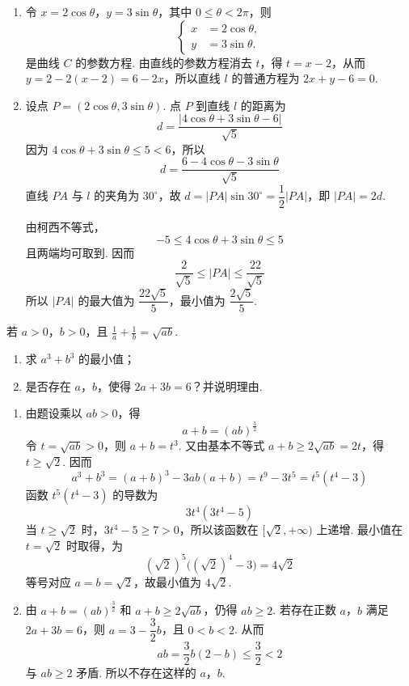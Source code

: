 \begin{solution}
\begin{enumerate}
\item 令 \(x=2\cos\theta\)，\(y=3\sin\theta\)，其中
\(0\leqslant\theta<2\pi\)，则
\[
\left\{
\begin{aligned}
x&=2\cos\theta,\\
y&=3\sin\theta.
\end{aligned}
\right.
\]
是曲线 \(C\) 的参数方程. 由直线的参数方程消去 \(t\)，得
\(t=x-2\)，从而 \(y=2-2(x-2)=6-2x\)，所以直线 \(l\) 的普通方程为
\(2x+y-6=0\).

\item 设点 \(P=(2\cos\theta,3\sin\theta)\). 点 \(P\) 到直线 \(l\) 的距离为
\[
d=\frac{|4\cos\theta+3\sin\theta-6|}{\sqrt5}
\]
因为 \(4\cos\theta+3\sin\theta\leqslant5<6\)，所以
\[
d=\frac{6-4\cos\theta-3\sin\theta}{\sqrt5}
\]
直线 \(PA\) 与 \(l\) 的夹角为 \(30^{\circ}\)，故
\(d=|PA|\sin30^{\circ}=\dfrac12|PA|\)，即 \(|PA|=2d\).

由柯西不等式，
\[
-5\leqslant4\cos\theta+3\sin\theta\leqslant5
\]
且两端均可取到. 因而
\[
\frac{2}{\sqrt5}\leqslant|PA|\leqslant\frac{22}{\sqrt5}
\]
所以 \(|PA|\) 的最大值为 \(\dfrac{22\sqrt5}{5}\)，最小值为
\(\dfrac{2\sqrt5}{5}\).
\end{enumerate}
\end{solution}

\begin{problem}
若 \(a > 0\)，\(b > 0\)，且 \(\frac{1}{a} + \frac{1}{b} = \sqrt{ab}\).

\begin{enumerate}
\item 求 \(a^3 + b^3\) 的最小值；
\item 是否存在 \(a\)，\(b\)，使得 \(2a + 3b = 6\)？并说明理由.
\end{enumerate}
\end{problem}

\begin{solution}
\begin{enumerate}
\item 由题设乘以 \(ab>0\)，得
\[
a+b=(ab)^{\frac{3}{2}}
\]
令 \(t=\sqrt{ab}>0\)，则 \(a+b=t^3\). 又由基本不等式
\(a+b\geqslant2\sqrt{ab}=2t\)，得 \(t\geqslant\sqrt2\). 因而
\[
a^3+b^3=(a+b)^3-3ab(a+b)=t^9-3t^5=t^5(t^4-3)
\]
函数 \(t^5(t^4-3)\) 的导数为
\[
3t^4(3t^4-5)
\]
当 \(t\geqslant\sqrt2\) 时，\(3t^4-5\geqslant7>0\)，所以该函数在
\([\sqrt2,+\infty)\) 上递增. 最小值在 \(t=\sqrt2\) 时取得，为
\[
(\sqrt2)^5\bigl((\sqrt2)^4-3\bigr)=4\sqrt2
\]
等号对应 \(a=b=\sqrt2\)，故最小值为 \(4\sqrt2\).

\item 由 \(a+b=(ab)^{\frac{3}{2}}\) 和 \(a+b\geqslant2\sqrt{ab}\)，仍得
\(ab\geqslant2\). 若存在正数 \(a\)，\(b\) 满足 \(2a+3b=6\)，则
\(a=3-\dfrac32b\)，且 \(0<b<2\). 从而
\[
ab=\frac32b(2-b)\leqslant\frac32<2
\]
与 \(ab\geqslant2\) 矛盾. 所以不存在这样的 \(a\)，\(b\).
\end{enumerate}
\end{solution}
